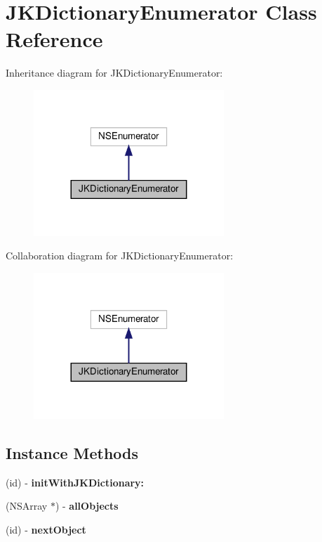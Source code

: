 \hypertarget{interfaceJKDictionaryEnumerator}{}\section{J\+K\+Dictionary\+Enumerator Class Reference}
\label{interfaceJKDictionaryEnumerator}


Inheritance diagram for J\+K\+Dictionary\+Enumerator\+:
\nopagebreak
\begin{figure}[H]
\begin{center}
\leavevmode
\includegraphics[width=203pt]{interfaceJKDictionaryEnumerator__inherit__graph}
\end{center}
\end{figure}


Collaboration diagram for J\+K\+Dictionary\+Enumerator\+:
\nopagebreak
\begin{figure}[H]
\begin{center}
\leavevmode
\includegraphics[width=203pt]{interfaceJKDictionaryEnumerator__coll__graph}
\end{center}
\end{figure}
\subsection*{Instance Methods}
\begin{DoxyCompactItemize}
\item 
\mbox{\label{interfaceJKDictionaryEnumerator_a5085cc23ae119b8cdf4328f8333e6ae7}} 
(id) -\/ {\bfseries init\+With\+J\+K\+Dictionary\+:}
\item 
\mbox{\label{interfaceJKDictionaryEnumerator_aeacc476cb120593fb2b140e019427c97}} 
(N\+S\+Array $\ast$) -\/ {\bfseries all\+Objects}
\item 
\mbox{\label{interfaceJKDictionaryEnumerator_ae72411e7e1dda3b91950ddcd210bb7cf}} 
(id) -\/ {\bfseries next\+Object}
\end{DoxyCompactItemize}
